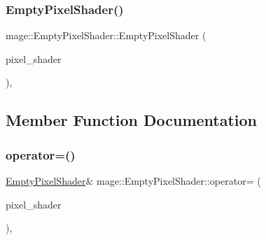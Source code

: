 \hypertarget{classmage_1_1_empty_pixel_shader_a5eaa8370d531fcc7877cc706bc8fbcce}{}\label{classmage_1_1_empty_pixel_shader_a5eaa8370d531fcc7877cc706bc8fbcce} 
\subsubsection{\texorpdfstring{Empty\+Pixel\+Shader()}{EmptyPixelShader()}\hspace{0.1cm}{\footnotesize\ttfamily [2/2]}}
{\footnotesize\ttfamily mage\+::\+Empty\+Pixel\+Shader\+::\+Empty\+Pixel\+Shader (\begin{DoxyParamCaption}\item[{const \hyperlink{classmage_1_1_empty_pixel_shader}{Empty\+Pixel\+Shader} \&}]{pixel\+\_\+shader }\end{DoxyParamCaption})\hspace{0.3cm}{\ttfamily [private]}, {\ttfamily [delete]}}



\subsection{Member Function Documentation}
\hypertarget{classmage_1_1_empty_pixel_shader_a7702fdae1d752ed422d1508e6ee08479}{}\label{classmage_1_1_empty_pixel_shader_a7702fdae1d752ed422d1508e6ee08479} 
\subsubsection{\texorpdfstring{operator=()}{operator=()}}
{\footnotesize\ttfamily \hyperlink{classmage_1_1_empty_pixel_shader}{Empty\+Pixel\+Shader}\& mage\+::\+Empty\+Pixel\+Shader\+::operator= (\begin{DoxyParamCaption}\item[{const \hyperlink{classmage_1_1_empty_pixel_shader}{Empty\+Pixel\+Shader} \&}]{pixel\+\_\+shader }\end{DoxyParamCaption})\hspace{0.3cm}{\ttfamily [private]}, {\ttfamily [delete]}}

\hypertarget{classmage_1_1_empty_pixel_shader_a492a634cc8ef167f92c63f8d863e8e6b}{}\label{classmage_1_1_empty_pixel_shader_a492a634cc8ef167f92c63f8d863e8e6b} 

